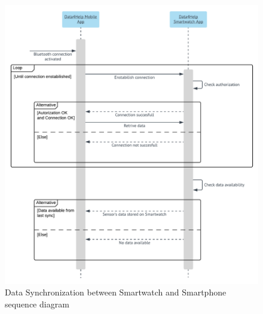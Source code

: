 \begin{figure}[H]
  \includegraphics[width=\textwidth,height=\textheight,keepaspectratio]{assets/sequence/DataSynchronizationBetweenSmartwatchAndSmartphone.pdf}
  \caption{Data Synchronization between Smartwatch and Smartphone sequence diagram}
  \label{fig:DataSynchronizationBetweenSmartwatchAndSmartphone}
\end{figure}










\newpage

